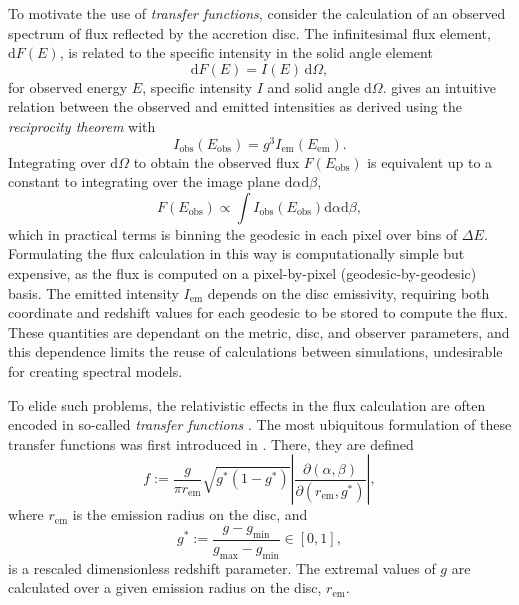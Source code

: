 \documentclass[fleqn,usenatbib]{mnras}
\renewcommand{\d}{\text{d}}
\newcommand{\jacobian}[2]{\left\lvert \frac{\partial #1}{\partial #2} \right\rvert}
\begin{document}
To motivate the use of \emph{transfer functions}, consider the calculation of an
observed spectrum of flux reflected by the accretion disc. The infinitesimal
flux element, $\d F(E)$, is related to the specific intensity in the solid angle element
\begin{equation}
\label{eq:infinitesimal-flux}
\d F(E) = I(E)\, \d \Omega,
\end{equation}
for observed energy $E$, specific intensity $I$ and solid angle $\d \Omega$.
\cite{cunningham_effects_1975} gives an intuitive relation between the observed
and emitted intensities as derived using the \emph{reciprocity theorem} \citep[or
equivalently \emph{Liouville's theorem};][]{lindquist_louville_1966} with
\begin{equation}
\label{eq:liouville-theorem}
I_\text{obs}\left( E_\text{obs}\right) = g^3 I_\text{em}\left(E_\text{em}\right).
\end{equation}
Integrating over $\d \Omega$ to obtain the observed flux $F(E_\text{obs})$ is
equivalent up to a constant to integrating over the image plane $\d \alpha \d
\beta$,
\begin{equation}
\label{eq:integrate-impact-params}
F(E_\text{obs}) \propto \int I_\text{obs}(E_\text{obs}) \d \alpha \d \beta,
\end{equation}
which in practical terms is binning the geodesic in each pixel over bins of
$\Delta E$.  Formulating the flux calculation in this way is computationally
simple but expensive, as the flux is computed on a pixel-by-pixel
(geodesic-by-geodesic) basis. The emitted intensity $I_\text{em}$ depends on the
disc emissivity, requiring both coordinate and redshift values for each geodesic
to be stored to compute the flux. These quantities are dependant on the metric,
disc, and observer parameters, and this dependence limits the reuse of
calculations between simulations, undesirable for creating spectral models.

To elide such problems, the relativistic effects in the flux calculation are
often encoded in so-called \emph{transfer functions}
\citep{brenneman_constraining_2006}. The most ubiquitous formulation of these
transfer functions was first introduced in \cite{cunningham_effects_1975}.
There, they are defined
\begin{equation}
    \label{eq:cunn-transfer-function}
    f:=\frac{g}{\pi r_\text{em}} \sqrt{g^\ast(1 - g^\ast)} \jacobian{(\alpha, \beta)}{(r_\text{em}, g^\ast)},
\end{equation}
where $r_\text{em}$ is the emission radius on the disc, and
\begin{equation}
    g^\ast := \frac{g - g_\text{min}}{g_\text{max} - g_\text{min}} \in [0, 1],
\end{equation}
is a rescaled dimensionless redshift parameter. The extremal values of $g$ are
calculated over a given emission radius on the disc, $r_\text{em}$.
\end{document}
